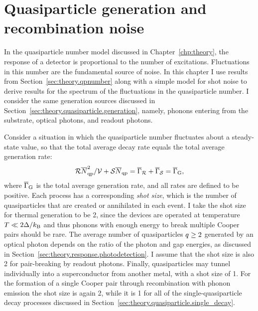 \section{Quasiparticle generation and recombination noise}
\label{sec:sensitivity.quasiparticle}

In the quasiparticle number model discussed in Chapter~\ref{chp:theory}, the response of a detector is proportional to the number of excitations.
Fluctuations in this number are the fundamental source of noise.
In this chapter I use results from Section~\ref{sec:theory.qpnumber} along with a simple model for shot noise to derive results for the spectrum of the fluctuations in the quasiparticle number.
I consider the same generation sources discussed in Section~\ref{sec:theory.quasiparticle.generation}, namely, phonons entering from the substrate, optical photons, and readout photons.

Consider a situation in which the quasiparticle number fluctuates about a steady-state value, so that the total average decay rate equals the total average generation rate:
\begin{equation}
\mathcal{R} \overline{N}_{\mathrm{qp}}^2 / \mathcal{V} + \mathcal{S} \overline{N}_{\mathrm{qp}}
  =
  \overline{\Gamma}_{\mathcal{R}} + \overline{\Gamma}_{\mathcal{S}}
  =
  \overline{\Gamma}_{\mathrm{G}},
\end{equation}
where $\overline{\Gamma}_{\mathrm{G}}$ is the total average generation rate, and all rates are defined to be positive.
Each process has a corresponding \textit{shot size}, which is the number of quasiparticles that are created or annihilated in each event.
I take the shot size for thermal generation to be 2, since the devices are operated at temperature $T \ll 2 \Delta / k_\mathrm{B}$ and thus phonons with enough energy to break multiple Cooper pairs should be rare.
The average number of quasiparticles $q \ge 2$ generated by an optical photon depends on the ratio of the photon and gap energies, as discussed in Section~\ref{sec:theory.response.photodetection}.
I assume that the shot size is also 2 for pair-breaking by readout photons.
Finally, quasiparticles may tunnel individually into a superconductor from another metal, with a shot size of 1.
For the formation of a single Cooper pair through recombination with phonon emission the shot size is again 2, while it is 1 for all of the single-quasiparticle decay processes discussed in Section~\ref{sec:theory.quasiparticle.single_decay}.

